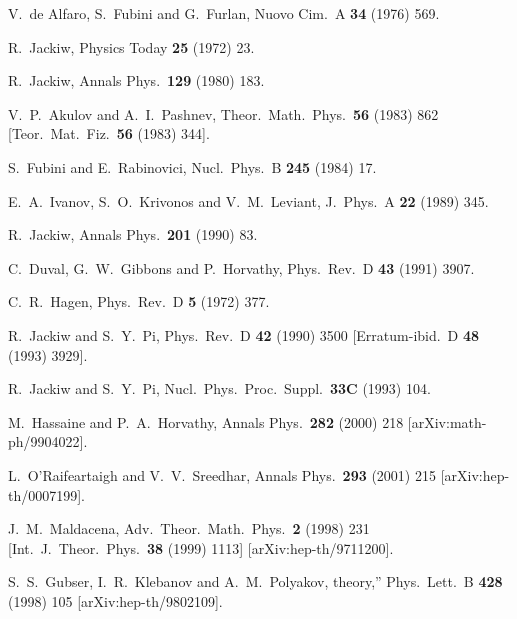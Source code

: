\documentclass[a4paper,12pt]{article}
\begin{document}
\begin{thebibliography}{99}

V.~de Alfaro, S.~Fubini and G.~Furlan,
Nuovo Cim.\ A {\bf 34} (1976) 569.

R.~Jackiw,
Physics Today {\bf 25} (1972) 23.


R.~Jackiw,
Annals Phys.\  {\bf 129} (1980) 183.

V.~P.~Akulov and A.~I.~Pashnev,
Theor.\ Math.\ Phys.\  {\bf 56} (1983) 862
[Teor.\ Mat.\ Fiz.\  {\bf 56} (1983) 344].

S.~Fubini and E.~Rabinovici,
Nucl.\ Phys.\ B {\bf 245} (1984) 17.

E.~A.~Ivanov, S.~O.~Krivonos and V.~M.~Leviant,
J.\ Phys.\ A {\bf 22} (1989) 345.

R.~Jackiw,
Annals Phys.\  {\bf 201} (1990) 83.

C.~Duval, G.~W.~Gibbons and P.~Horvathy,
Phys.\ Rev.\ D {\bf 43} (1991) 3907.

C.~R.~Hagen,
Phys.\ Rev.\ D {\bf 5} (1972) 377.


R.~Jackiw and S.~Y.~Pi,
Phys.\ Rev.\ D {\bf 42} (1990) 3500
[Erratum-ibid.\ D {\bf 48} (1993) 3929].


R.~Jackiw and S.~Y.~Pi,
Nucl.\ Phys.\ Proc.\ Suppl.\  {\bf 33C} (1993) 104.


M.~Hassaine and P.~A.~Horvathy,
Annals Phys.\  {\bf 282} (2000) 218
[arXiv:math-ph/9904022].


L.~O'Raifeartaigh and V.~V.~Sreedhar,
Annals Phys.\  {\bf 293} (2001) 215
[arXiv:hep-th/0007199].


J.~M.~Maldacena,
Adv.\ Theor.\ Math.\ Phys.\  {\bf 2} (1998) 231
[Int.\ J.\ Theor.\ Phys.\  {\bf 38} (1999) 1113]
[arXiv:hep-th/9711200].


S.~S.~Gubser, I.~R.~Klebanov and A.~M.~Polyakov,
theory,''
Phys.\ Lett.\ B {\bf 428} (1998) 105
[arXiv:hep-th/9802109].


\end{thebibliography}
\end{document}
